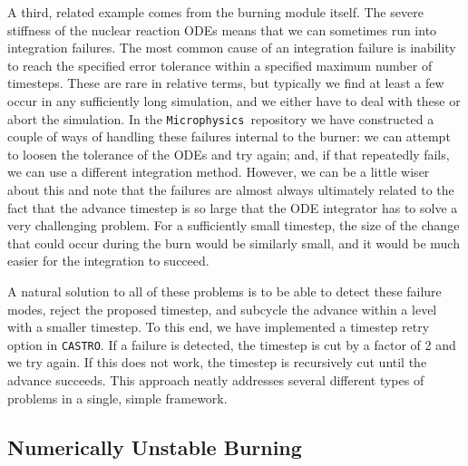 \documentclass[twocolumn,numberedappendix]{../aastex62}
\newcommand{\castro}{\texttt{CASTRO}}
\newcommand{\microphysics}{\texttt{Microphysics}}
\begin{document}
A third, related example comes from the burning module itself. The severe stiffness
of the nuclear reaction ODEs means that we can sometimes run into integration failures.
The most common cause of an integration failure is inability to reach the specified
error tolerance within a specified maximum number of timesteps. These are rare in
relative terms, but typically we find at least a few occur in any sufficiently long
simulation, and we either have to deal with these or abort the simulation. In the
\microphysics\ repository we have constructed a couple of ways of handling these
failures internal to the burner: we can attempt to loosen the tolerance of the ODEs
and try again; and, if that repeatedly fails, we can use a different integration method.
However, we can be a little wiser about this and note that the failures are almost always
ultimately related to the fact that the advance timestep is so large that the ODE
integrator has to solve a very challenging problem. For a sufficiently small timestep,
the size of the change that could occur during the burn would be similarly small,
and it would be much easier for the integration to succeed.

A natural solution to all of these problems is to be able to detect these failure
modes, reject the proposed timestep, and subcycle the advance within a level with
a smaller timestep. To this end, we have implemented a timestep retry option in
\castro. If a failure is detected, the timestep is cut by a factor of 2 and we
try again. If this does not work, the timestep is recursively cut until the
advance succeeds. This approach neatly addresses several different types of
problems in a single, simple framework.



\subsection{Numerically Unstable Burning}
\label{sec:unstable_burning}
\end{document}
